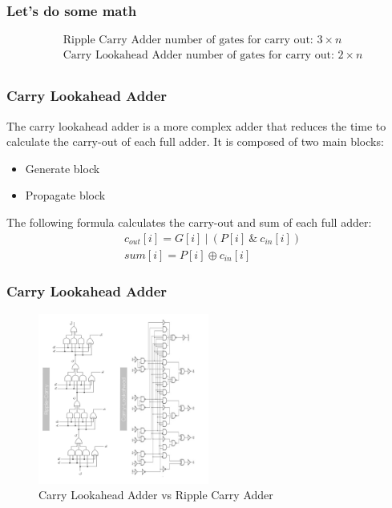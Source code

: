 \begin{frame}
    \frametitle{Let's do some math}
    \begin{equation}
        \begin{aligned}
            & \text{Ripple Carry Adder number of gates for carry out: } 3 \times n\\
            & \text{Carry Lookahead Adder number of gates for carry out: } 2 \times n\\
        \end{aligned}
    \end{equation}
\end{frame}


\begin{frame}
    \frametitle{Carry Lookahead Adder}
 The carry lookahead adder is a more complex adder that reduces the time to calculate the carry-out of each full adder. It is composed of two main blocks:
    \begin{itemize}
        \item Generate block
        \item Propagate block
    \end{itemize}
 The following formula calculates the carry-out and sum of each full adder:
    \begin{equation}
        \begin{aligned}
            &c_{out}[i]=G[i] \ | \ (P[i] \ \& \ c_{in}[i])\\
            &sum[i]=P[i] \oplus c_{in}[i]
        \end{aligned}
    \end{equation}

\end{frame}

\begin{frame}
    \frametitle{Carry Lookahead Adder}
    \begin{figure}
        \centering
        \includegraphics[width=0.5\textwidth, angle=270 ]{media/adders_comparison.jpg}
        \caption{Carry Lookahead Adder vs Ripple Carry Adder}
    \end{figure}
\end{frame}


